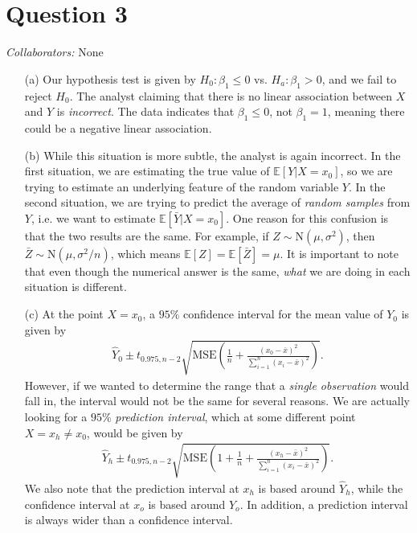 \documentclass[10pt]{article}
\newcommand{\mycolaba}[1]{\textcolor{colabcol}{\textsl{Collaborators:}} #1}
\begin{document}
\section{Question 3} \noindent
\mycolaba{None}
\begin{itemize}
    \item[(a)] Our hypothesis test is given by \(H_0:\beta_1 \le 0\) vs. \(H_a:\beta_1 > 0\), and we fail to reject \(H_0\). The analyst claiming that 
    there is no linear association between \(X\) and \(Y\) is \textsl{incorrect}. The data indicates that \(\beta_1 \le 0\), not \(\beta_1 = 1\), meaning
    there could be a negative linear association. 
    \item[(b)] While this situation is more subtle, the analyst is again incorrect. In the first situation, we are estimating the true value of 
    \(\mathbb{E}[Y|X=x_0]\), so we are trying to estimate an underlying feature of the random variable \(Y\). In the second situation, we are trying 
    to predict the average of \textsl{random samples} from \(Y\), i.e. we want to estimate \(\mathbb{E}[\bar{Y}|X=x_0]\). One reason for this confusion is that
    the two results are the same. For example, if \(Z \sim \mathrm{N}(\mu, \sigma^2)\), then \(\bar{Z}\sim\mathrm{N}(\mu,\sigma^2/n)\), which means 
    \(\mathbb{E}[Z] = \mathbb{E}[\bar{Z}] = \mu\). It is important to note that even though the numerical answer is the same, \textsl{what} we are doing in
    each situation is different.
    \item[(c)] At the point \(X = x_0\), a \(95\%{}\) confidence interval for the mean value of \(Y_0\) is given by 
    \begin{align*}
        \hat{Y}_0 \pm t_{0.975,n-2} \sqrt{\mathrm{MSE} \left( \frac{1}{n} + \frac{(x_0 - \bar{x})^2}{\sum_{i=1}^n(x_i - \bar{x})^2} \right)}.
    \end{align*}
    However, if we wanted to determine the range that a \textsl{single observation} would fall in, 
    the interval would not be the same for several reasons. We are actually looking for a \(95\%{}\) \textsl{prediction interval}, which 
    at some different point \(X = x_h \neq x_0\), would be given by 
    \begin{align*}
        \hat{Y}_h \pm t_{0.975,n-2} \sqrt{\mathrm{MSE} \left( 1 + \frac{1}{n} + \frac{(x_h - \bar{x})^2}{\sum_{i=1}^n(x_i - \bar{x})^2} \right)}.
    \end{align*}
    We also note that the prediction interval at \(x_h\) is based around \(\hat{Y}_h\), while the confidence interval at \(x_o\) is based around \(\hat{Y}_o\). 
    In addition, a prediction interval is always wider than a confidence interval. 
\end{itemize}
\end{document}
